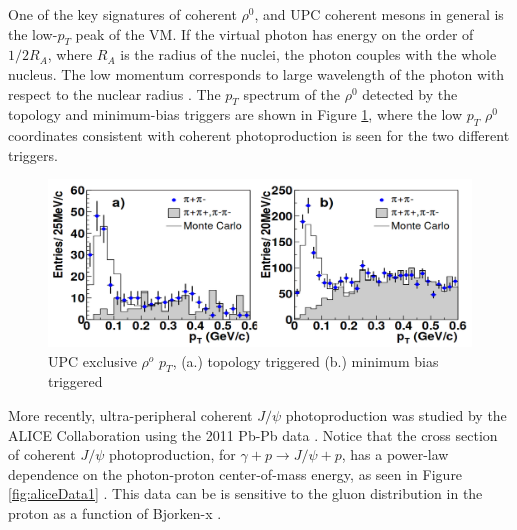 One of the key signatures of coherent $\rho^0$, and UPC coherent mesons in general is the low-$p_T$ peak of the VM. If the virtual photon has energy on the order of $1/2R_{A}$, where $R_{A}$ is the radius of the nuclei, the photon couples with the whole nucleus. The low momentum corresponds to large wavelength of the photon with respect to the nuclear radius \cite{Guzey:2013taa}\cite{Frankfurt:2006wg}\cite{Baltz:2002pp}\cite{Klein:2003vd}. The $p_T$ spectrum of the $\rho^0$ detected by the topology and minimum-bias triggers are shown in Figure \ref{fig:upcRhoStarPt}, where the low $p_T$ $\rho^0$ coordinates consistent with coherent photoproduction is seen for the two different triggers.

\begin{figure}[h!]
\begin{centering}
\includegraphics[width=5.5in]{Chapter2/importfigs/rho_upc_pt_star.png}
\par\end{centering}
\caption{UPC exclusive $\rho^o$ $p_T$, (a.) topology triggered (b.) minimum bias triggered \cite{Adler:2002sc} \label{fig:upcRhoStarPt}}
\end{figure}

More recently, ultra-peripheral coherent $J/\psi$ photoproduction was studied by the ALICE Collaboration using the 2011 Pb-Pb data \cite{Abelev:2012ba}. Notice that the cross section of coherent $J/\psi$ photoproduction, for $\gamma+p\rightarrow J/\psi+p$, has a power-law dependence on the photon-proton center-of-mass energy, as seen in Figure \ref{fig:aliceData1} \cite{Klein:2017nqo}. This data can be is sensitive to the gluon distribution in the proton as a function of Bjorken-x \cite{pQCD2011.08}.

